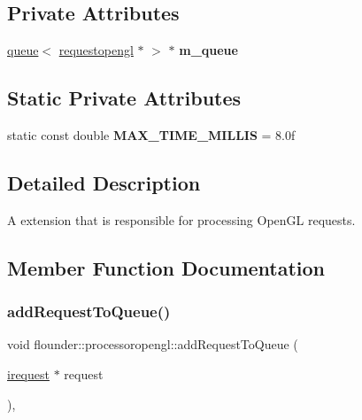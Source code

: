 \subsection*{Private Attributes}
\begin{DoxyCompactItemize}
\item 
\mbox{\label{classflounder_1_1processoropengl_ad7fed4222e4b75c56bfce7c593cbe7c6}} 
\hyperlink{classflounder_1_1queue}{queue}$<$ \hyperlink{classflounder_1_1requestopengl}{requestopengl} $\ast$ $>$ $\ast$ {\bfseries m\+\_\+queue}
\end{DoxyCompactItemize}
\subsection*{Static Private Attributes}
\begin{DoxyCompactItemize}
\item 
\mbox{\label{classflounder_1_1processoropengl_a344599e84ea4460a6a43a573ac3a595d}} 
static const double {\bfseries M\+A\+X\+\_\+\+T\+I\+M\+E\+\_\+\+M\+I\+L\+L\+IS} = 8.\+0f
\end{DoxyCompactItemize}


\subsection{Detailed Description}
A extension that is responsible for processing Open\+GL requests. 



\subsection{Member Function Documentation}
\mbox{\label{classflounder_1_1processoropengl_a5063ad5c1f350f26733a748a7e039a9a}} 
\subsubsection{\texorpdfstring{add\+Request\+To\+Queue()}{addRequestToQueue()}}
{\footnotesize\ttfamily void flounder\+::processoropengl\+::add\+Request\+To\+Queue (\begin{DoxyParamCaption}\item[{\hyperlink{classflounder_1_1irequest}{irequest} $\ast$}]{request }\end{DoxyParamCaption})\hspace{0.3cm}{\ttfamily [override]}, {\ttfamily [virtual]}}



